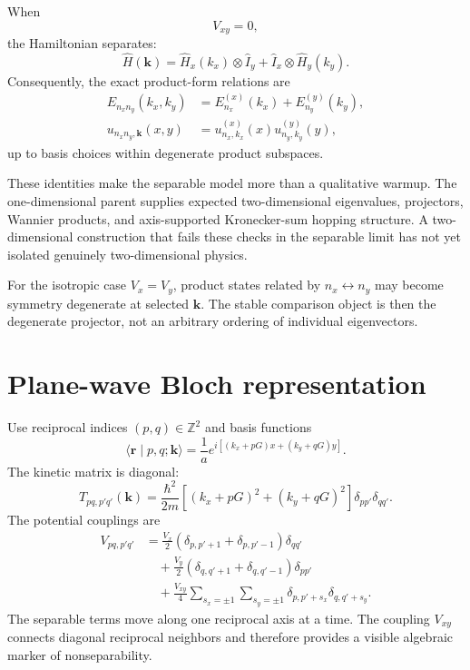 When
\begin{equation}
    V_{xy}=0,
\end{equation}
the Hamiltonian separates:
\begin{equation}
    \hat H(\mathbf k)
    =
    \hat H_x(k_x)
    \otimes
    \hat I_y
    +
    \hat I_x
    \otimes
    \hat H_y(k_y).
\end{equation}
Consequently, the exact product-form relations are
\begin{align}
    E_{n_xn_y}(k_x,k_y)
    &=
    E_{n_x}^{(x)}(k_x)
    +
    E_{n_y}^{(y)}(k_y),
    \\
    u_{n_xn_y,\mathbf k}(x,y)
    &=
    u_{n_x,k_x}^{(x)}(x)
    u_{n_y,k_y}^{(y)}(y),
\end{align}
up to basis choices within degenerate product subspaces.

These identities make the separable model more than a qualitative warmup. The
one-dimensional parent supplies expected two-dimensional eigenvalues,
projectors, Wannier products, and axis-supported Kronecker-sum hopping
structure. A two-dimensional
construction that fails these checks in the separable limit has not yet
isolated genuinely two-dimensional physics.

For the isotropic case $V_x=V_y$, product states related by
$n_x\leftrightarrow n_y$ may become symmetry degenerate at selected
$\mathbf k$. The stable comparison object is then the degenerate projector,
not an arbitrary ordering of individual eigenvectors.

\section*{Plane-wave Bloch representation}

Use reciprocal indices $(p,q)\in\mathbb Z^2$ and basis functions
\begin{equation}
    \langle\mathbf r\mid p,q;\mathbf k\rangle
    =
    \frac{1}{a}
    e^{i[(k_x+pG)x+(k_y+qG)y]}.
\end{equation}
The kinetic matrix is diagonal:
\begin{equation}
    T_{pq,p'q'}(\mathbf k)
    =
    \frac{\hbar^2}{2m}
    \left[
        (k_x+pG)^2+(k_y+qG)^2
    \right]
    \delta_{pp'}\delta_{qq'}.
\end{equation}
The potential couplings are
\begin{align}
    V_{pq,p'q'}
    &=
    \frac{V_x}{2}
    \left(
        \delta_{p,p'+1}+\delta_{p,p'-1}
    \right)
    \delta_{qq'}
    \\
    &\quad+
    \frac{V_y}{2}
    \left(
        \delta_{q,q'+1}+\delta_{q,q'-1}
    \right)
    \delta_{pp'}
    \\
    &\quad+
    \frac{V_{xy}}{4}
    \sum_{s_x=\pm1}
    \sum_{s_y=\pm1}
    \delta_{p,p'+s_x}
    \delta_{q,q'+s_y}.
\end{align}
The separable terms move along one reciprocal axis at a time. The coupling
$V_{xy}$ connects diagonal reciprocal neighbors and therefore provides a
visible algebraic marker of nonseparability.

